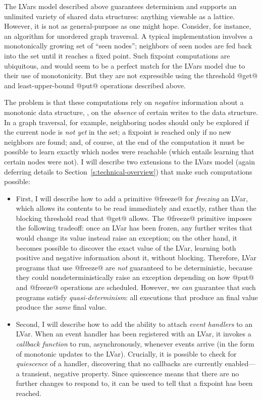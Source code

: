 \documentclass{article}
\begin{document}
The LVars model described above guarantees determinism and supports an
unlimited variety of shared data structures: anything viewable as a
lattice.  However, it is not as general-purpose as one might hope.
Consider, for instance, an algorithm for unordered graph traversal.  A
typical implementation involves a monotonically growing set of ``seen
nodes''; neighbors of seen nodes are fed back into the set until it
reaches a fixed point.  Such fixpoint computations are ubiquitous, and
would seem to be a perfect match for the LVars model due to their use
of monotonicity.  But they are not expressible using the threshold
@get@ and least-upper-bound @put@ operations described above.

The problem is that these computations rely on \emph{negative}
information about a monotonic data structure, \ie, on the
\emph{absence} of certain writes to the data structure.  In a graph
traversal, for example, neighboring nodes should only be explored if
the current node is \emph{not yet} in the set; a fixpoint is reached
only if no new neighbors are found; and, of course, at the end of the
computation it must be possible to learn exactly which nodes were
reachable (which entails learning that certain nodes were not).  I
will describe two extensions to the LVars model (again deferring
details to Section~\ref{s:technical-overview}) that make such
computations possible:
\begin{itemize}
\item First, I will describe how to add a primitive @freeze@ for
  \emph{freezing} an LVar, which allows its contents to be read
  immediately and exactly, rather than the blocking threshold read
  that @get@ allows.  The @freeze@ primitive imposes the following
  tradeoff: once an LVar has been frozen, any further writes that
  would change its value instead raise an exception; on the other
  hand, it becomes possible to discover the exact value of the LVar,
  learning both positive and negative information about it, without
  blocking.  Therefore, LVar programs that use @freeze@ are \emph{not}
  guaranteed to be deterministic, because they could
  nondeterministically raise an exception depending on how @put@ and
  @freeze@ operations are scheduled.  However, we \emph{can} guarantee
  that such programs satisfy \emph{quasi-determinism}: all executions
  that produce an final value produce the \emph{same} final value.
\item Second, I will describe how to add the ability to attach
  \emph{event handlers} to an LVar.  When an event handler has been
  registered with an LVar, it invokes a \emph{callback function} to
  run, asynchronously, whenever events arrive (in the form of
  monotonic updates to the LVar).  Crucially, it is possible to check
  for \emph{quiescence} of a handler, discovering that no callbacks
  are currently enabled---a transient, negative property.  Since
  quiescence means that there are no further changes to respond to, it
  can be used to tell that a fixpoint has been reached.
\end{itemize}
\end{document}
